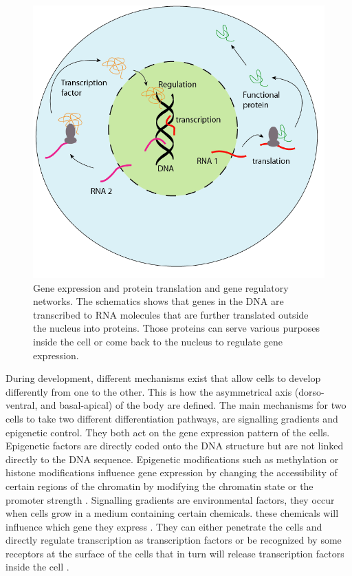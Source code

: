 	
\begin{figure}[bth]
\begin{center}
  \includegraphics[width=0.8\linewidth]{gfx/chapter1/cell.png}
\end{center}
  \caption{Gene expression and protein translation and gene regulatory networks. The schematics shows that genes in the DNA are transcribed to RNA molecules that are further translated outside the nucleus into proteins. Those proteins can serve various purposes inside the cell or come back to the nucleus to regulate gene expression.}
  \label{fig:cells}
\end{figure}
	
	
	
	During development, different mechanisms exist that allow cells to develop differently from one to the other. This is how the asymmetrical axis (dorso-ventral, and basal-apical) of the body are defined. The main mechanisms for two cells to take two different differentiation pathways, are signalling gradients and epigenetic control. They both act on the gene expression pattern of the cells. Epigenetic factors are directly coded onto the DNA structure but are not linked directly to the DNA sequence. Epigenetic modifications such as methylation or histone modifications influence gene expression by changing the accessibility of certain regions of the chromatin by modifying the chromatin state or the promoter strength \cite{jaenisch03}. Signalling gradients are environmental factors, they occur when cells grow in a medium containing certain chemicals. these chemicals will influence which gene they express \cite{chang02}. They can either penetrate the cells and directly regulate transcription as transcription factors \cite{durston89} or be recognized by some receptors at the surface of the cells that in turn will release transcription factors inside the cell \cite{wang92}. \\
	
